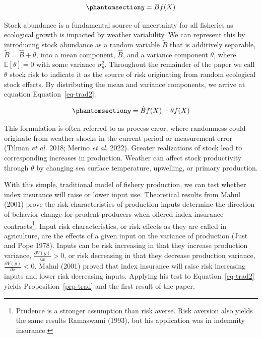\documentclass[
  letterpaper,
  DIV=11,
  numbers=noendperiod]{scrartcl}
\theoremstyle{plain}
\theoremstyle{plain}
\theoremstyle{remark}
\begin{document}
\begin{equation}\phantomsection\label{eq-trad}{
y=Bf(X)
}\end{equation}

Stock abundance is a fundamental source of uncertainty for all fisheries
as ecological growth is impacted by weather variability. We can
represent this by introducing stock abundance as a random variable
\(\tilde{B}\) that is additively separable,
\(\tilde{B}=\hat{B}+\theta\), into a mean component, \(\hat{B}\), and a
variance component \(\theta\), where \(\mathbb{E}[\theta]=0\) with some
variance \(\sigma_\theta^2\). Throughout the remainder of the paper we
call \(\theta\) stock risk to indicate it as the source of risk
originating from random ecological stock effects. By distributing the
mean and variance components, we arrive at equation
Equation~\ref{eq-trad2}.

\begin{equation}\phantomsection\label{eq-trad2}{
y=\hat{B}f(X)+\theta f(X)
}\end{equation}

This formulation is often referred to as process error, where randomness
could originate from weather shocks in the current period or measurement
error (Tilman \emph{et al.} 2018; Merino \emph{et al.} 2022). Greater
realizations of stock lead to corresponding increases in production.
Weather can affect stock productivity through \(\theta\) by changing sea
surface temperature, upwelling, or primary production.

With this simple, traditional model of fishery production, we can test
whether index insurance will raise or lower input use. Theoretical
results from Mahul (2001) prove the risk characteristics of production
inputs determine the direction of behavior change for prudent producers
when offered index insurance contracts\footnote{Prudence is a stronger
  assumption than risk averse. Risk aversion also yields the same
  results Ramaswami (1993), but his application was in indemnity
  insurance.}. Input risk characteristics, or risk effects as they are
called in agriculture, are the effects of a given input on the variance
of production (Just and Pope 1978). Inputs can be risk increasing in
that they increase production variance,
\(\frac{\partial V(y)}{\partial x}>0\), or risk decreasing in that they
decrease production variance, \(\frac{\partial V(y)}{\partial x}<0\).
Mahul (2001) proved that index insurance will raise risk increasing
inputs and lower risk decreasing inputs. Applying his test to
Equation~\ref{eq-trad2} yields Proposition~\ref{prp-trad} and the first
result of the paper.
\end{document}
